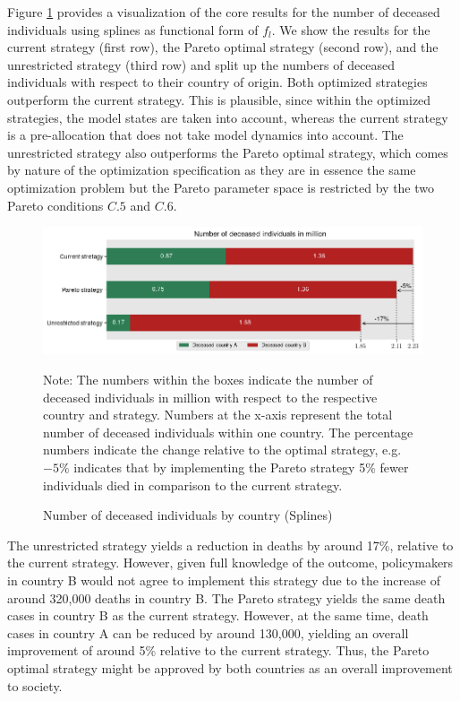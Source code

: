 Figure \ref{fig:results_splines_numbers} provides a visualization of the core results for the number of deceased individuals using splines as functional form of $f_l$. We show the results for the current strategy (first row), the Pareto optimal strategy (second row), and the unrestricted strategy (third row) and split up the numbers of deceased individuals with respect to their country of origin. Both optimized strategies outperform the current strategy. This is plausible, since within the optimized strategies, the model states are taken into account, whereas the current strategy is a pre-allocation that does not take model dynamics into account. The unrestricted strategy also outperforms the Pareto optimal strategy, which comes by nature of the optimization specification as they are in essence the same optimization problem but the Pareto parameter space is restricted by the two Pareto conditions $C.5$ and $C.6$. 
\begin{figure}[h!]
\centering
\includegraphics[scale=0.75]{images/splines_percentage_deviation.png}
\begin{flushleft}
\scriptsize{Note: The numbers within the boxes indicate the number of deceased individuals in million with respect to the respective country and strategy. Numbers at the x-axis represent the total number of deceased individuals within one country. The percentage numbers indicate the change relative to the optimal strategy, e.g. $-5\%$ indicates that by implementing the Pareto strategy 5\% fewer individuals died in comparison to the current strategy.}
\end{flushleft}
\caption{Number of deceased individuals by country (Splines)}
\label{fig:results_splines_numbers}
\end{figure}

The unrestricted strategy yields a reduction in deaths by around 17\%, relative to the current strategy. However, given full knowledge of the outcome, policymakers in country B would not agree to implement this strategy due to the increase of around 320,000 deaths in country B. The Pareto strategy yields the same death cases in country B as the current strategy. However, at the same time, death cases in country A can be reduced by around 130,000, yielding an overall improvement of around 5\% relative to the current strategy. Thus, the Pareto optimal strategy might be approved by both countries as an overall improvement to society. \\


